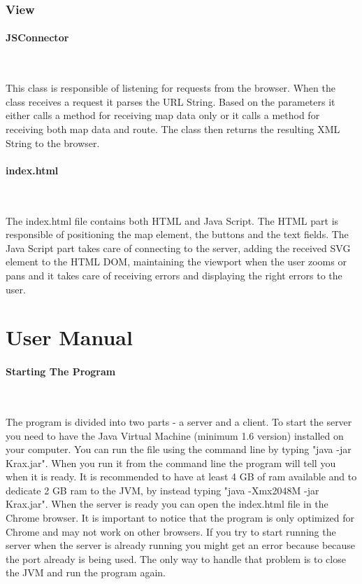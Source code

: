 \documentclass[a4paper,10pt,titlepage]{article}
\begin{document}
			\newpage	
			\subsubsection{View}
			
				\paragraph{JSConnector}\mbox{}\
				
				This class is responsible of listening for requests from the browser. When the class receives a request it parses the URL String. Based on the parameters it either calls a method for receiving map data only or it calls a method for receiving both map data and route. The class then returns the resulting XML String to the browser. 
						
				\paragraph{index.html}\mbox{}\
				
				The index.html file contains both HTML and Java Script. The HTML part is responsible of positioning the map element, the buttons and the text fields. The Java Script part takes care of connecting to the server, adding the received SVG element to the HTML DOM, maintaining the viewport when the user zooms or pans and it takes care of receiving errors and displaying the right errors to the user. 

	\newpage
	\section{User Manual}
		\paragraph{Starting The Program}\mbox{}\
	
		The program is divided into two parts - a server and a client. To start the server you need to have the Java Virtual Machine (minimum 1.6 version) installed on your computer. You can run the file using the command line by typing "java -jar Krax.jar". When you run it from the command line the program will tell you when it is ready. It is recommended to have at least 4 GB of ram available and to dedicate 2 GB ram to the JVM, by instead typing "java -Xmx2048M -jar Krax.jar". When the server is ready you can open the index.html file in the Chrome browser. It is important to notice that the program is only optimized for Chrome and may not work on other browsers. If you try to start running the server when the server is already running you might get an error because because the port already is being used. The only way to handle that problem is to close the JVM and run the program again.  
\end{document}
